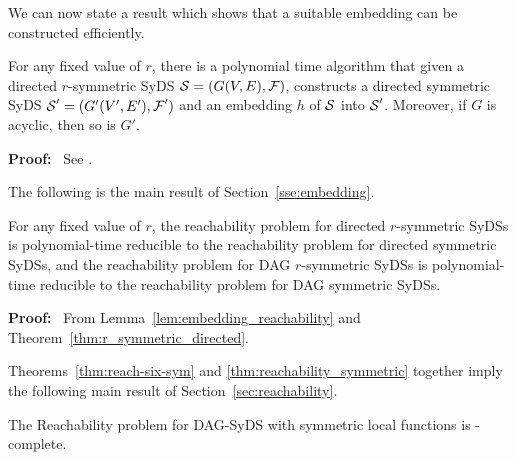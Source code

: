We can now state a result which shows that a suitable embedding
can be constructed efficiently.

\begin{theorem}\label{thm:r_symmetric_directed}
For any fixed value of $r$, there is a polynomial time algorithm that
given a directed $r$-symmetric SyDS $\mbox{$\mathcal{S}$} = (G(V,E), \mbox{$\mathcal{F}$})$,
constructs a directed symmetric SyDS $\mbox{$\mathcal{S}$}' = (G'(V',E'), \mbox{$\mathcal{F}$}')$
and an embedding $h$ of $\mbox{$\mathcal{S}$}$ into $\mbox{$\mathcal{S}$}'$.  Moreover, if  $G$
is acyclic, then so is $G'$.  
\end{theorem}

\noindent
\textbf{Proof:}~ See \cite{Rosenkrantz-etal-2020}.

\smallskip

The following is the main result of Section~\ref{sse:embedding}.

\begin{theorem}\label{thm:reachability_symmetric}
For any fixed value of $r$, the reachability problem for directed
$r$-symmetric  SyDSs is polynomial-time reducible to the reachability
problem for directed symmetric SyDSs, and  the reachability problem
for DAG $r$-symmetric  SyDSs is polynomial-time reducible to the
reachability problem for DAG symmetric SyDSs.  
\end{theorem}

\noindent 
\textbf{Proof:}~ From Lemma~\ref{lem:embedding_reachability}
and Theorem~\ref{thm:r_symmetric_directed}.  \QED

\smallskip

Theorems~\ref{thm:reach-six-sym} and \ref{thm:reachability_symmetric}
together imply the following main result
of Section~\ref{sec:reachability}.

\begin{theorem}\label{thm:dag_syds_sym_hard}
The Reachability problem for DAG-SyDS with symmetric local functions is
\cpsp-complete. \QED
\end{theorem}

